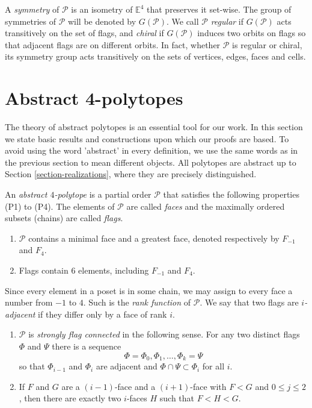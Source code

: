A \textit{symmetry} of $\mathcal{P}$ is an
isometry of $\mathbb{E}^4$ that preserves it
set-wise. The group of symmetries of
$\mathcal{P}$ will be denoted by
$G(\mathcal{P})$. We call $\mathcal{P}$
\textit{regular} if $G(\mathcal{P})$ acts
transitively on the set of flags, and
\textit{chiral} if $G(\mathcal{P})$ induces
two orbits on flags so that adjacent flags
are on different orbits. In fact, whether
$\mathcal{P}$ is regular or chiral, its
symmetry group acts transitively on the sets
of vertices, edges, faces and cells.

\section{Abstract 4-polytopes}
\label{section-abstract-4-polytopes}

\noindent
The theory of abstract polytopes is an
essential tool for our work. In this section
we state basic results and constructions upon
which our proofs are based. To avoid using
the word 'abstract' in every definition, we
use the same words as in the previous section
to mean different objects. All polytopes are
abstract up to Section
\ref{section-realizations}, where they are
precisely distinguished.

An \textit{abstract $4$-polytope} is a
partial order $\mathcal{P}$ that satisfies
the following properties (P1) to (P4). The
elements of $\mathcal{P}$ are called
\textit{faces} and the maximally ordered
subsets (chains) are called \textit{flags}.
\begin{enumerate}
\item[(P1)] $\mathcal{P}$ contains a minimal
face and a greatest face, denoted
respectively by $F_{-1}$ and $F_4$.
\item[(P2)] Flags contain $6$ elements,
including $F_{-1}$ and $F_4$.
\end{enumerate}
Since every element in a poset is in some
chain, we may assign to every face a number
from $-1$ to $4$. Such is the \textit{rank
function} of $\mathcal{P}$. We say that two
flags are \textit{$i$-adjacent} if they
differ only by a face of rank $i$.
\begin{enumerate}
\item[(P3)] $\mathcal{P}$ is \textit{strongly
flag connected} in the following sense. For
any two distinct flags $\Phi$ and $\Psi$
there is a sequence
$$
\Phi=\Phi_0,\Phi_1,\ldots,\Phi_k=\Psi
$$
so that $\Phi_{i-1}$ and $\Phi_i$ are
adjacent and $\Phi\cap\Psi\subset\Phi_i$ for
all $i$.
\item[(P4)] If $F$ and $G$ are a $(i-1)$-face
and a $(i+1)$-face with $F<G$ and $0\leq
j\leq2$, then there are exactly two $i$-faces
$H$ such that $F<H<G$.
\end{enumerate}

